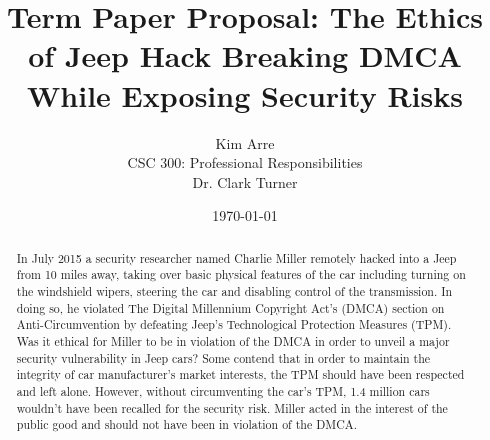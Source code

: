 \documentclass[12pt]{article}
\begin{document}

\title{\vfill Term Paper Proposal: The Ethics of Jeep Hack Breaking DMCA While Exposing Security Risks} %
\author{
  Kim Arre \vspace{10pt} \\
  CSC 300: Professional Responsibilities  \vspace{10pt} \\
  Dr. Clark Turner \vspace{10pt} \\
}
\date{\today}

\maketitle

\vfill  %
\begin{abstract}
In July 2015 a security researcher named Charlie Miller remotely hacked into a Jeep from 10 miles away, taking over basic physical features of the car including turning on the windshield wipers, steering the car and disabling control of the transmission. In doing so, he violated The Digital Millennium Copyright Act's (DMCA) section on Anti-Circumvention by defeating Jeep's Technological Protection Measures (TPM). Was it ethical for Miller to be in violation of the DMCA in order to unveil a major security vulnerability in Jeep cars? Some contend that in order to maintain the integrity of car manufacturer's market interests, the TPM should have been respected and left alone. However, without circumventing the car's TPM, 1.4 million cars wouldn't have been recalled for the security risk. Miller acted in the interest of the public good and should not have been in violation of the DMCA.
\end{abstract}

\thispagestyle{empty} %
\newpage
\end{document}
